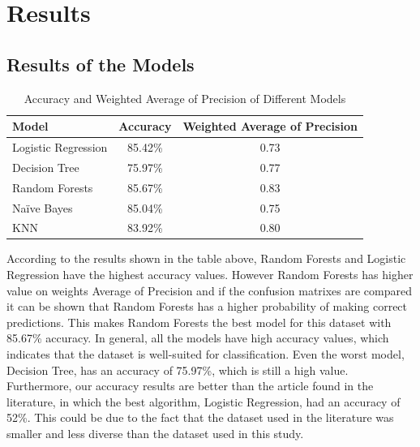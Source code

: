 

\chapter{Results}

\section{Results of the Models}

\begin{table}[htbp]
    \centering
    \begin{tabular}{|l|c|c|}
    \hline
    \textbf{Model}           & \textbf{Accuracy} & \textbf{Weighted Average of Precision} \\ \hline
    Logistic Regression & 85.42\%          & 0.73                \\ \hline
    Decision Tree       & 75.97\%          & 0.77              \\ \hline
    Random Forests      & 85.67\%          & 0.83             \\ \hline
    Naïve Bayes         & 85.04\%          & 0.75               \\ \hline
    KNN                 & 83.92\%          & 0.80               \\ \hline
    \end{tabular}
    \caption{Accuracy and Weighted Average of Precision of Different Models}
    \end{table}
    
According to the results shown in the table above, Random Forests and Logistic Regression have the highest accuracy values. However Random Forests has 
higher value on weights Average of Precision
and if the confusion matrixes are compared it can be shown that Random Forests has a higher 
probability of making correct predictions. This makes Random Forests the best model for this dataset with 85.67\% accuracy. 
In general, all the models have high accuracy values, which indicates that the dataset is well-suited for classification. Even the worst model, Decision Tree, has an accuracy of 75.97\%, which is still a high value.\\
Furthermore, our accuracy results are better than the article found in the literature, in which the best algorithm, Logistic Regression, had an accuracy of 52\%. This could be due to the fact that the dataset used in the literature was smaller and less diverse than the dataset used in this study.
\\


